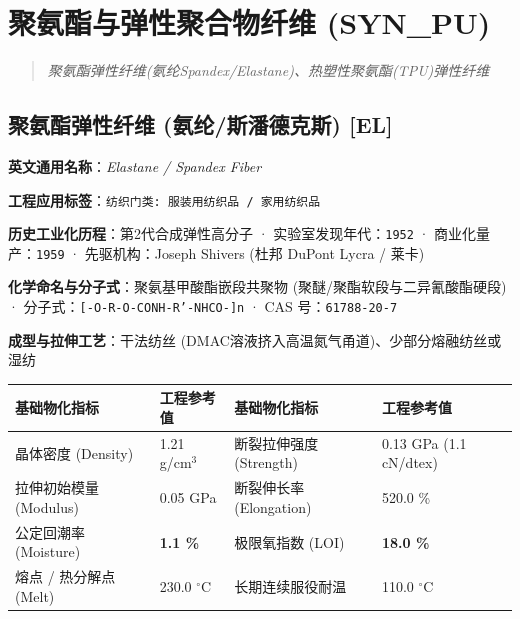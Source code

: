 \documentclass[11pt,openright,twoside,UTF8]{ctexbook}
\begin{document}
\chapter{聚氨酯与弹性聚合物纤维 (SYN\_PU)}
\begin{quote}
\small\itshape
聚氨酯弹性纤维(氨纶Spandex/Elastane)、热塑性聚氨酯(TPU)弹性纤维
\end{quote}

\section{聚氨酯弹性纤维 (氨纶/斯潘德克斯) [EL]}
\label{sec:el}

\noindent\textbf{英文通用名称}：\textit{Elastane / Spandex Fiber}\par
\noindent\textbf{工程应用标签}：\texttt{纺织门类: 服装用纺织品 / 家用纺织品}\par
\noindent\textbf{历史工业化历程}：第2代合成弹性高分子 · 实验室发现年代：\texttt{1952} · 商业化量产：\texttt{1959} · 先驱机构：Joseph Shivers (杜邦 DuPont Lycra / 莱卡)\par
\noindent\textbf{化学命名与分子式}：聚氨基甲酸酯嵌段共聚物 (聚醚/聚酯软段与二异氰酸酯硬段) · 分子式：\texttt{[-O-R-O-CONH-R'-NHCO-]n} · CAS 号：\texttt{61788-20-7}\par
\noindent\textbf{成型与拉伸工艺}：干法纺丝 (DMAC溶液挤入高温氮气甬道)、少部分熔融纺丝或湿纺\par

\vspace{0.15cm}
\begin{center}
\small
\begin{tabularx}{\textwidth}{p{3.8cm}Xp{3.8cm}X}
\toprule
\textbf{基础物化指标} & \textbf{工程参考值} & \textbf{基础物化指标} & \textbf{工程参考值} \\
\midrule
晶体密度 (Density) & 1.21 g/cm$^3$ & 断裂拉伸强度 (Strength) & 0.13 GPa (1.1 cN/dtex) \\
拉伸初始模量 (Modulus) & 0.05 GPa & 断裂伸长率 (Elongation) & 520.0 \% \\
公定回潮率 (Moisture) & \textbf{1.1 \%} & 极限氧指数 (LOI) & \textbf{18.0 \%} \\
熔点 / 热分解点 (Melt) & 230.0 $^\circ\mathrm{C}$ & 长期连续服役耐温 & 110.0 $^\circ\mathrm{C}$ \\
\bottomrule
\end{tabularx}
\end{center}
\vspace{0.15cm}
\end{document}
